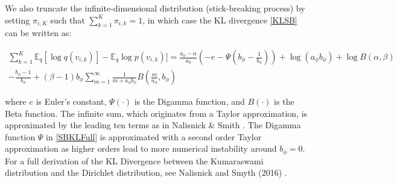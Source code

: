 \documentclass{report}
\begin{document}
We also truncate the infinite-dimensional distribution (stick-breaking process) by setting $\pi_{i,K}$ such that $\sum_{k=1}^{K}\pi_{i,k} = 1$, in which case the KL divergence \ref{KLSB} can be written as:

\begin{align}\label{SBKLFull}
\sum_{k=1}^{K}\mathbb{E}_q [\log q(v_{i,k})] - \mathbb{E}_q \log p(v_{i,k})] = \frac{a_0 -\alpha}{a_0}(-e-\Psi(b_\phi-\frac{1}{b_\phi}))+ \log(a_\phi b_\phi) + \log B(\alpha, \beta) \\
- \frac{b_\phi -1}{b_\phi} 
+ (\beta-1)b_\phi\sum_{m=1}^{\infty}\frac{1}{m+a_\phi b_\phi}B(\frac{m}{a_\phi},b_\phi)
\end{align}

where $e$ is Euler’s constant, $\Psi(\cdot)$ is the Digamma function, and $B(\cdot)$ is the Beta function.
The infinite sum, which originates from a Taylor approximation, is approximated by the leading ten terms as in Nalisnick \& Smith \cite{nalisnick2016deep}. The Digamma function $\Psi$ in \ref{SBKLFull} is approximated with a second order Taylor approximation as higher orders lead to more numerical instability around $b_\phi = 0$. \\
For a full derivation of the KL Divergence between the Kumaraswami distribution and the Dirichlet distribution, see Nalisnick and Smyth (2016) \cite{nalisnick2016deep}.
\end{document}
